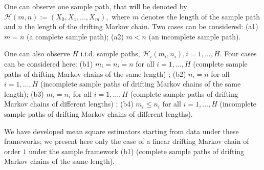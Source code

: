 \documentclass[article,nojss]{jss}\usepackage[]{graphicx}\usepackage[]{color}
\begin{document}
One can observe one sample path, that will be denoted by ${\mathcal H}(m,n):= (X_0,X_1, \ldots,X_{m}),$ where $m$ denotes the length of the sample path and $n$ the length of the drifting Markov chain. Two cases can be considered: (a1) $m=n$ (a complete sample path); (a2) $m < n$ (an incomplete sample path).

One can also observe $H$ i.i.d. sample paths, ${\mathcal H}_i(m_i,n_i), i=1, \ldots, H.$ Four cases can be considered here: (b1) $m_i=n_i=n$ for all $i=1, \ldots, H$ (complete sample paths of drifting Markov chains of the same length) ; (b2)  $n_i=n$  for all $i=1, \ldots, H$ (incomplete sample paths of drifting Markov chains of the same length); (b3) $m_i=n_i$ for all $i=1, \ldots, H$ (complete sample paths of drifting Markov chains of different lengths) ; (b4) $m_i \leq n_i$ for all $i=1, \ldots, H$ (incomplete sample paths of drifting Markov chains of different lengths).

We have developed \citep[cf.][]{Ver08,BaVe2018} mean square estimators starting from data under these frameworks; we present here only the case of a linear drifting Markov chain of order $1$ under the sample framework (b1) (complete sample paths of drifting Markov chains of the same length).
\end{document}
